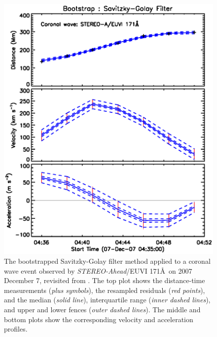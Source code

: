 \documentclass[referee]{aa}
\begin{document}
\begin{figure}
\centering
\includegraphics[scale=0.6, trim=0 40 0 30]{images/fit_kinscasestudy_wave20071207.eps}
\caption{The bootstrapped Savitzky-Golay filter method applied to a coronal wave event observed by \emph{STEREO-Ahead}/EUVI 171\AA\ on 2007 December 7, revisited from \citet{2011A&A...531A..42L}. The top plot shows the distance-time measurements (\emph{plus symbols}), the resampled residuals (\emph{red points}), and the median (\emph{solid line}), interquartile range (\emph{inner dashed lines}), and upper and lower fences (\emph{outer dashed lines}). The middle and bottom plots show the corresponding velocity and acceleration profiles.}
\label{fig_savgol_wave}
\end{figure}
\end{document}
